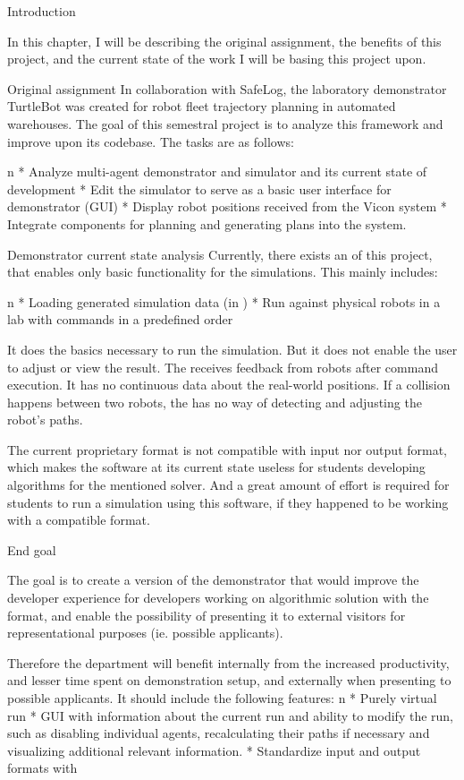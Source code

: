 \chap Introduction

In this chapter, I will be describing the original assignment, the benefits of this project, and the current state of the work I will be basing this project upon.

\sec Original assignment
In collaboration with SafeLog, the laboratory demonstrator TurtleBot was created for robot fleet trajectory planning in automated warehouses. The goal of this semestral project is to analyze this framework and improve upon its codebase. The tasks are as follows:

\begitems \style n
    * Analyze multi-agent demonstrator and simulator {\mapfIR} and its current state of development 
    * Edit the simulator to serve as a basic user interface for demonstrator (GUI)
    * Display robot positions received from the Vicon system
    * Integrate components for planning and generating plans into the system.
\enditems

\sec Demonstrator current state analysis
Currently, there exists an {\oldRepo} of this project, that enables only basic functionality for the simulations. This mainly includes:

\begitems \style n
    * Loading generated simulation data (in {\oldFormat})
    * Run against physical robots in a lab with commands in a predefined order
\enditems

It does the basics necessary to run the simulation. But it does not enable the user to adjust or view the result. The {\oldRepo} receives feedback from robots after command execution. It has no continuous data about the real-world positions. If a collision happens between two robots, the {\oldRepo} has no way of detecting and adjusting the robot's paths.

The current proprietary format is not compatible with {\mapfIR} input nor output format, which makes the software at its current state useless for students developing algorithms for the mentioned solver. And a great amount of effort is required for students to run a simulation using this software, if they happened to be working with a compatible format.

\sec End goal

The goal is to create a version of the demonstrator that would improve the developer experience for developers working on algorithmic solution with the {\mapfIR} format, and enable the possibility of presenting it to external visitors for representational purposes (ie. possible applicants).

Therefore the department will benefit internally from the increased productivity, and lesser time spent on demonstration setup, and externally when presenting to possible applicants.
It should include the following features:
\begitems \style n
    * Purely virtual run
    * GUI with information about the current run and ability to modify the run, such as disabling individual agents, recalculating their paths if necessary and visualizing additional relevant information.
    * Standardize input and output formats with \mapfIR
\enditems